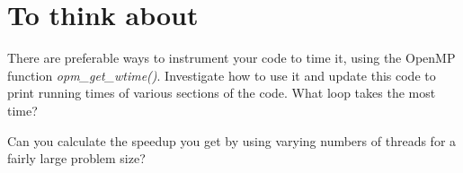 \documentclass[letterpaper,10pt,openany,oneside]{sphinxmanual}
\begin{document}
\section{To think about}
\label{8.1-ompBuildAndRun/omp_build:to-think-about}
There are preferable ways to instrument your code to time it, using the OpenMP function \emph{opm\_get\_wtime()}.  Investigate how to use it and update this code to print running times of various sections of the code.  What loop takes the most time?

Can you calculate the speedup you get by using varying numbers of threads for a fairly large problem size?



\renewcommand{\indexname}{Index}
\printindex
\end{document}
